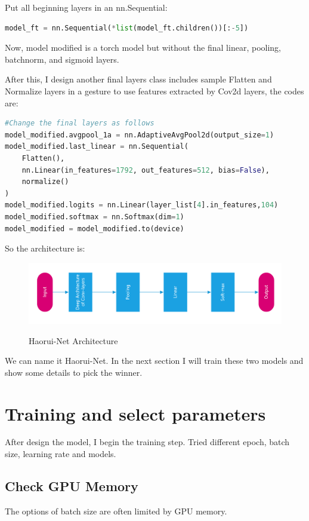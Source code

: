 \documentclass{article}
\begin{document}
Put all beginning layers in an nn.Sequential:
\begin{lstlisting}[language=Python, caption=Keep the conv2d layers]
model_ft = nn.Sequential(*list(model_ft.children())[:-5])
\end{lstlisting}
Now, model modified is a torch model but without the final linear, pooling, batchnorm, and sigmoid layers.

After this, I design another final layers class includes sample Flatten and Normalize layers in a gesture to use features extracted by Cov2d layers, the codes are:
\begin{lstlisting}[language=Python, caption=Haorui Net]
#Change the final layers as follows
model_modified.avgpool_1a = nn.AdaptiveAvgPool2d(output_size=1)
model_modified.last_linear = nn.Sequential(
    Flatten(),
    nn.Linear(in_features=1792, out_features=512, bias=False),
    normalize()
)
model_modified.logits = nn.Linear(layer_list[4].in_features,104)
model_modified.softmax = nn.Softmax(dim=1)
model_modified = model_modified.to(device)
\end{lstlisting}
So the architecture is:
\begin{figure}[H]%
  \centering
  \caption{Haorui-Net Architecture}
  \includegraphics[width=\columnwidth]{IMG/haoruinet.png} %
  \label{Fig.RNN} %
\end{figure}

We can name it Haorui-Net. In the next section I will train these two models and show some details to pick the winner.

\section{Training and select parameters}
After design the model, I begin the training step. Tried different epoch, batch size, learning rate and models.

\subsection{Check GPU Memory}
The options of batch size are often limited by GPU memory.
\end{document}
